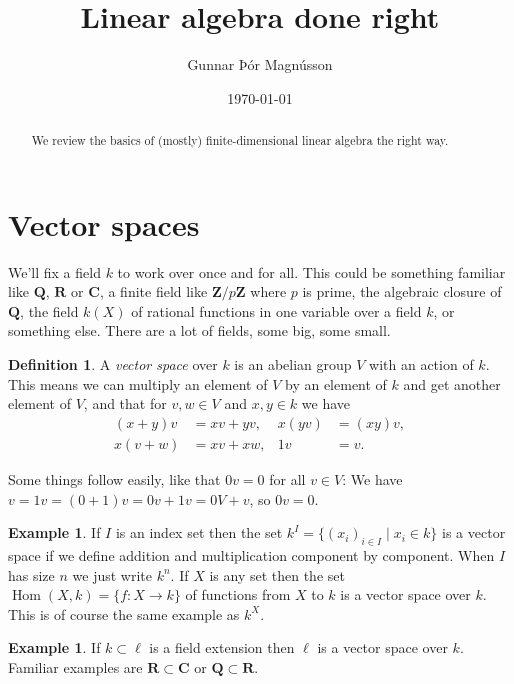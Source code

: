\documentclass[11pt]{article}
\author{Gunnar Þór Magnússon}
\date{\today}
\title{Linear algebra done right}
\theoremstyle{definition}
\newtheorem{defi}[theo]{Definition}
\newtheorem{exam}[theo]{Example}
\def\CC{\mathbf{C}}
\def\RR{\mathbf{R}}
\def\QQ{\mathbf{Q}}
\def\ZZ{\mathbf{Z}}
\DeclareMathOperator{\Hom}{Hom}
\begin{document}
\maketitle

\begin{abstract}
We review the basics of (mostly) finite-dimensional linear algebra the right way.
\end{abstract}

\section{Vector spaces}


We'll fix a field $k$ to work over once and for all.
This could be something familiar like $\QQ$, $\RR$ or $\CC$, a finite field like $\ZZ/p \ZZ$ where $p$ is prime, the algebraic closure of $\QQ$, the field $k(X)$ of rational functions in one variable over a field $k$, or something else.
There are a lot of fields, some big, some small.


\begin{defi}
A \emph{vector space} over $k$ is an abelian group $V$ with an action of $k$.
This means we can multiply an element of $V$ by an element of $k$ and get
another element of $V$, and that for $v,w \in V$ and $x,y \in k$ we have
\begin{align*}
(x + y) v &= xv + yv,
          &
x(yv) &= (xy) v,
\\
x(v + w) &= xv + xw,
      &
1 v &= v.
\end{align*}
\end{defi}


Some things follow easily, like that $0v = 0$ for all $v \in V$:
We have $v = 1v = (0 + 1)v = 0v + 1v = 0V + v$, so $0v = 0$.


\begin{exam}
If $I$ is an index set then the set $k^I = \{ (x_i)_{i \in I} \mid x_i \in k\}$ is a vector space if we define addition and multiplication component by component.
When $I$ has size $n$ we just write $k^n$.
If $X$ is any set then the set $\Hom(X,k) = \{ f : X \to k \}$ of functions from $X$ to $k$ is a vector space over $k$.
This is of course the same example as $k^X$.
\end{exam}

\begin{exam}
If $k \subset \ell$ is a field extension then $\ell$ is a vector space over $k$.
Familiar examples are $\RR \subset \CC$ or $\QQ \subset \RR$.
\end{exam}
\end{document}
